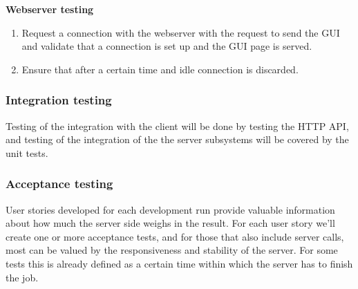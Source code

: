 \textbf{Webserver testing}
\begin{enumerate}
\item Request a connection with the webserver with the request to send the GUI and validate that a connection is set up and the GUI page is  served. 
\item Ensure that after a certain time and idle connection is discarded.
\end{enumerate}

\subsubsection{Integration testing}
Testing of the integration with the client will be done by testing the HTTP API, and testing of the integration of the the server subsystems will be covered by the unit tests.

\subsubsection{Acceptance testing}
User stories developed for each development run provide valuable information about how much the server side weighs in the result. For each user story we'll create one or more acceptance tests, and for those that also include server calls, most can be valued by the responsiveness and stability of the server. For some tests this is already defined as a certain time within which the server has to finish the job.
